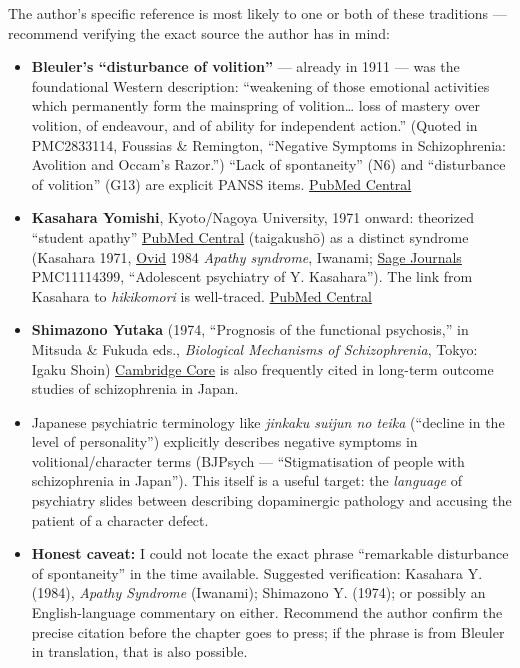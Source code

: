 The author's specific reference is most likely to one or both of these traditions --- recommend verifying the exact source the author has in mind:

\begin{itemize}
\tightlist
\item
  \textbf{Bleuler's ``disturbance of volition''} --- already in 1911 --- was the foundational Western description: ``weakening of those emotional activities which permanently form the mainspring of volition\ldots{} loss of mastery over volition, of endeavour, and of ability for independent action.'' (Quoted in PMC2833114, Foussias \& Remington, ``Negative Symptoms in Schizophrenia: Avolition and Occam's Razor.'') ``Lack of spontaneity'' (N6) and ``disturbance of volition'' (G13) are explicit PANSS items. \href{https://pmc.ncbi.nlm.nih.gov/articles/PMC2833114/}{PubMed Central}
\item
  \textbf{Kasahara Yomishi}, Kyoto/Nagoya University, 1971 onward: theorized ``student apathy'' \href{https://pmc.ncbi.nlm.nih.gov/articles/PMC11114399/}{PubMed Central} (taigakushō) as a distinct syndrome (Kasahara 1971, \href{https://www.ovid.com/journals/pacnr/fulltext/10.1002/pcn5.120~adolescent-psychiatry-of-y-kasahara-and-succeeding-research}{Ovid} 1984 \emph{Apathy syndrome}, Iwanami; \href{https://journals.sagepub.com/doi/10.1177/070674379403901012}{Sage Journals} PMC11114399, ``Adolescent psychiatry of Y. Kasahara''). The link from Kasahara to \emph{hikikomori} is well-traced. \href{https://pmc.ncbi.nlm.nih.gov/articles/PMC11114399/}{PubMed Central}
\item
  \textbf{Shimazono Yutaka} (1974, ``Prognosis of the functional psychosis,'' in Mitsuda \& Fukuda eds., \emph{Biological Mechanisms of Schizophrenia}, Tokyo: Igaku Shoin) \href{https://www.cambridge.org/core/journals/the-british-journal-of-psychiatry/article/abs/longterm-followup-study-of-schizophrenia-in-japan-with-special-reference-to-the-course-of-social-adjustment/D2214EA6A260E08FE813B31AC2116448}{Cambridge Core} is also frequently cited in long-term outcome studies of schizophrenia in Japan.
\item
  Japanese psychiatric terminology like \emph{jinkaku suijun no teika} (``decline in the level of personality'') explicitly describes negative symptoms in volitional/character terms (BJPsych --- ``Stigmatisation of people with schizophrenia in Japan''). This itself is a useful target: the \emph{language} of psychiatry slides between describing dopaminergic pathology and accusing the patient of a character defect.
\item
  \textbf{Honest caveat:} I could not locate the exact phrase ``remarkable disturbance of spontaneity'' in the time available. Suggested verification: Kasahara Y. (1984), \emph{Apathy Syndrome} (Iwanami); Shimazono Y. (1974); or possibly an English-language commentary on either. Recommend the author confirm the precise citation before the chapter goes to press; if the phrase is from Bleuler in translation, that is also possible.
\end{itemize}

